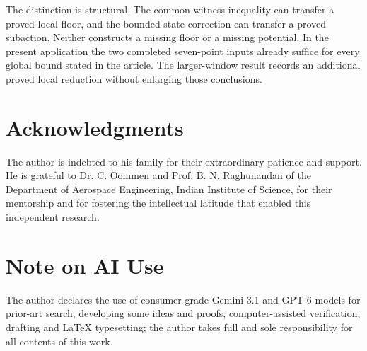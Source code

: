 \documentclass[11pt]{amsart}
\numberwithin{equation}{section}
\begin{document}
The distinction is structural. The common-witness inequality can
transfer a proved local floor, and the bounded state correction can
transfer a proved subaction. Neither constructs a missing floor or
a missing potential. In the present application the two completed
seven-point inputs already suffice for every global bound stated
in the article. The larger-window result records an additional
proved local reduction without enlarging those conclusions.

\section*{Acknowledgments}
The author is indebted to his family for their extraordinary patience and support. He is grateful to Dr. C. Oommen and Prof. B. N. Raghunandan of the Department of Aerospace Engineering, Indian Institute of Science, for their mentorship and for fostering the intellectual latitude that enabled this independent research.

\section*{Note on AI Use}
The author declares the use of consumer-grade Gemini 3.1 and GPT-6 models for prior-art search, developing some ideas and proofs, computer-assisted verification, drafting and LaTeX typesetting; the author takes full and sole responsibility for all contents of this work.


\end{document}
